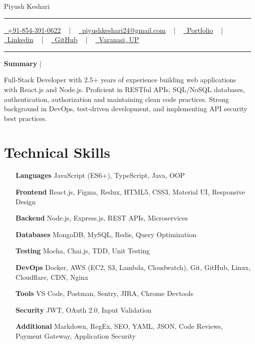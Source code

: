 \documentclass[letterpaper,10pt]{article}
\newcommand{\documentTitle}[2]{
 \begin{center}
   {\Huge\color{accentTitle} #1}
   \vspace{2pt}
   {\color{accentLine} \hrule height 0.8pt}
   \vspace{1pt}
   \footnotesize{#2}
   \vspace{1pt}
   {\color{accentLine} \hrule height 0.8pt}
 \end{center}
}
\newcommand{\tinysection}[1]{
  \phantomsection
  \addcontentsline{toc}{section}{#1}
  {\large{\bfseries\color{accentText}#1} {\color{accentLine} |}}
  \vspace{0.4pt}
}
\begin{document}
\documentTitle{Piyush Keshari}{
   \href{tel:+918543910622}{\underline{
     \raisebox{-0.05\height} \faPhone\ +91-854-391-0622}} ~ | ~
   \href{mailto:piyushkeshari24@gmail.com}{\underline{
     \raisebox{-0.15\height} \faEnvelope\ piyushkeshari24@gmail.com}} ~ | ~
   \href{https://kesharipiyush24.github.io/}{\underline{
     \raisebox{-0.15\height} \faGlobe\ Portfolio}} ~ | ~
   \href{https://linkedin.com/in/piyush-k-ba3a67134}{\underline{
     \raisebox{-0.15\height} \faLinkedin\ Linkedin}} ~ | ~
   \href{https://github.com/KeshariPiyush24}{\underline{
     \raisebox{-0.15\height} \faGithub\ GitHub}} ~ | ~
   \underline{
     \raisebox{-0.15\height} \faMapMarker\ Varanasi, UP}
}

\tinysection{Summary}
Full-Stack Developer with 2.5+ years of experience building web applications with React.js and Node.js. Proficient in RESTful APIs, SQL/NoSQL databases, authentication, authorization and maintaining clean code practices. Strong background in DevOps, test-driven development, and implementing API security best practices.

\section{Technical Skills}
\begin{multicols}{2}
  \begin{itemize}[itemsep=-2pt, parsep=0.5pt, leftmargin=65pt]
    \item[\textbf{Languages}] JavaScript (ES6+), TypeScript, Java, OOP
    \item[\textbf{Frontend}] React.js, Figma, Redux, HTML5, CSS3, Material UI, Responsive Design
    \item[\textbf{Backend}] Node.js, Express.js, REST APIs, Microservices
    \item[\textbf{Databases}] MongoDB, MySQL, Redis, Query Optimization
    \item[\textbf{Testing}] Mocha, Chai.js, TDD, Unit Testing
    \item[\textbf{DevOps}] Docker, AWS (EC2, S3, Lambda, Cloudwatch), Git, GitHub, Linux, Cloudflare, CDN, Nginx
    \item[\textbf{Tools}] VS Code, Postman, Sentry, JIRA, Chrome Devtools
    \item[\textbf{Security}] JWT, OAuth 2.0, Input Validation
    \item[\textbf{Additional}] Markdown, RegEx, SEO, YAML, JSON, Code Reviews, Payment Gateway, Application Security
  \end{itemize}
\end{multicols}
\end{document}
